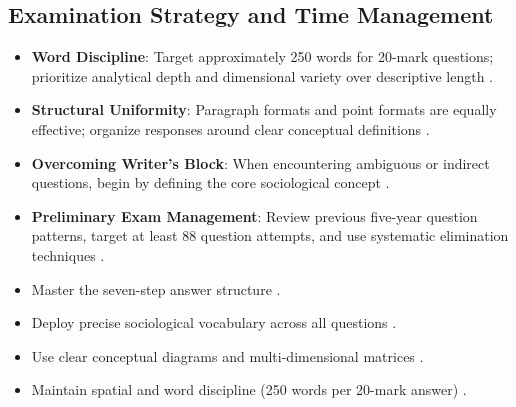 \subsection{Examination Strategy and Time Management}
\begin{itemize}
    \item \textbf{Word Discipline}: Target approximately 250 words for 20-mark questions; prioritize analytical depth and dimensional variety over descriptive length .
    \item \textbf{Structural Uniformity}: Paragraph formats and point formats are equally effective; organize responses around clear conceptual definitions .
    \item \textbf{Overcoming Writer's Block}: When encountering ambiguous or indirect questions, begin by defining the core sociological concept .
    \item \textbf{Preliminary Exam Management}: Review previous five-year question patterns, target at least 88 question attempts, and use systematic elimination techniques .
\end{itemize}

\begin{QuickRevision}
\begin{itemize}
    \item Master the seven-step answer structure .
    \item Deploy precise sociological vocabulary across all questions .
    \item Use clear conceptual diagrams and multi-dimensional matrices .
    \item Maintain spatial and word discipline (250 words per 20-mark answer) .
\end{itemize}
\end{QuickRevision}